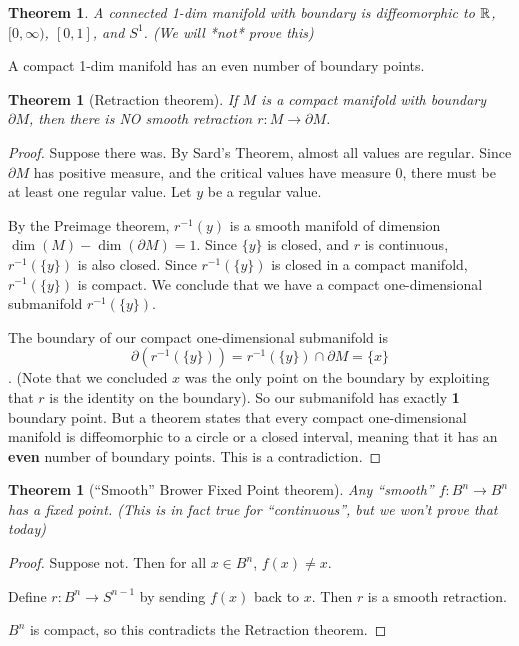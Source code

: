 \documentclass[11pt,leqno,oneside]{amsart}
\renewcommand{\d}{\partial}
\newcommand{\oo}{\infty}
\theoremstyle{mystyle} \newtheorem{thrm}[thm]{Theorem}
\theoremstyle{mystyle} \newtheorem{defi}[thm]{Definition}
\begin{document}
\begin{thrm}
	A connected 1-dim manifold with boundary is diffeomorphic to ${\mathbb R}$, $[0,\oo)$, $[0,1]$, and $S^1$.  (We will *not* prove this)
\end{thrm}
\begin{cor}
	A compact 1-dim manifold has an even number of boundary points.
\end{cor}
\begin{thrm}[Retraction theorem]
	If $M$ is a compact manifold with boundary $\d M$, then there is NO smooth retraction $r : M \to \d M$.
\end{thrm}
\begin{proof}
	Suppose there was.  By Sard's Theorem, almost all values are regular.  Since $\d M$ has positive measure, and the critical values have measure 0, there must be at least one regular value.  Let $y$ be a regular value.

	By the Preimage theorem, $r^{-1}(y)$ is a smooth manifold of dimension $\dim(M) - \dim(\d M) = 1$.  Since $\{y\}$ is closed, and $r$ is continuous, $r^{-1}(\{y\})$ is also closed.  Since $r^{-1}(\{y\})$ is closed in a compact manifold, $r^{-1}(\{y\})$ is compact.  We conclude that we have a compact one-dimensional submanifold $r^{-1}(\{y\})$.

	The boundary of our compact one-dimensional submanifold is $$\d (r ^{-1}(\{y\})) = r^{-1}(\{y\}) \cap \d M = \{x\}$$.  (Note that we concluded $x$ was the only point on the boundary by exploiting that $r$ is the identity on the boundary).   So our submanifold has exactly \textbf{1} boundary point.  But a theorem states that every compact one-dimensional manifold is diffeomorphic to a circle or a closed interval, meaning that it has an \textbf{even} number of boundary points.  This is a contradiction.
\end{proof}
\begin{thrm}[``Smooth'' Brower Fixed Point theorem]
	Any ``smooth'' $f : B^n \to B^n$ has a fixed point.  (This is in fact true for ``continuous'', but we won't prove that today)
\end{thrm}
\begin{proof}
	Suppose not.  Then for all $x \in B^n$, $f(x) \not= x$.

	Define $r : B^n \to S^{n-1}$ by sending $f(x)$ back to $x$.  Then $r$ is a smooth retraction.

	$B^n$ is compact, so this contradicts the Retraction theorem.
\end{proof}
\end{document}
